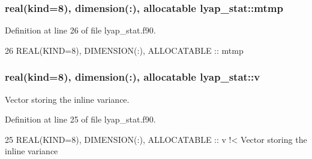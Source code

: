 \subsubsection[{\texorpdfstring{mtmp}{mtmp}}]{\setlength{\rightskip}{0pt plus 5cm}real(kind=8), dimension(\+:), allocatable lyap\+\_\+stat\+::mtmp\hspace{0.3cm}{\ttfamily [private]}}\hypertarget{namespacelyap__stat_a72cd3ecc682d386dbe39e331afa90f9f}{}\label{namespacelyap__stat_a72cd3ecc682d386dbe39e331afa90f9f}


Definition at line 26 of file lyap\+\_\+stat.\+f90.


\begin{DoxyCode}
26   \textcolor{keywordtype}{REAL(KIND=8)}, \textcolor{keywordtype}{DIMENSION(:)}, \textcolor{keywordtype}{ALLOCATABLE} :: mtmp  
\end{DoxyCode}
\subsubsection[{\texorpdfstring{v}{v}}]{\setlength{\rightskip}{0pt plus 5cm}real(kind=8), dimension(\+:), allocatable lyap\+\_\+stat\+::v\hspace{0.3cm}{\ttfamily [private]}}\hypertarget{namespacelyap__stat_a7cc5265a7fac9300755528c599fb08fb}{}\label{namespacelyap__stat_a7cc5265a7fac9300755528c599fb08fb}


Vector storing the inline variance. 



Definition at line 25 of file lyap\+\_\+stat.\+f90.


\begin{DoxyCode}
25   \textcolor{keywordtype}{REAL(KIND=8)}, \textcolor{keywordtype}{DIMENSION(:)}, \textcolor{keywordtype}{ALLOCATABLE} :: v\textcolor{comment}{       !< Vector storing the inline variance}
\end{DoxyCode}
